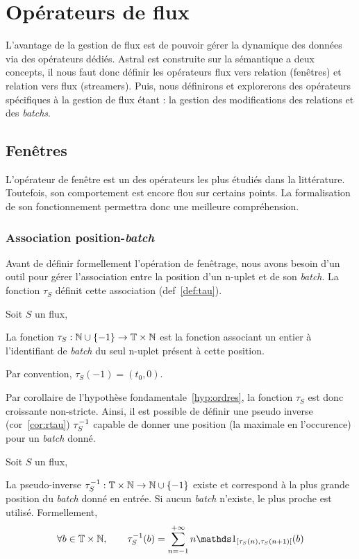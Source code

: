 \section{Opérateurs de flux}
L'avantage de la gestion de flux est de pouvoir gérer la dynamique des données via des opérateurs dédiés. Astral est construite sur la sémantique a deux concepts, il nous faut donc définir les opérateurs flux vers relation (fenêtres) et relation vers flux (streamers). Puis, nous définirons et explorerons des opérateurs spécifiques à la gestion de flux étant : la gestion des modifications des relations et des \textit{batchs}.
\subsection{Fenêtres}
L'opérateur de fenêtre est un des opérateurs les plus étudiés dans la littérature. Toutefois, son comportement est encore flou sur certains points. La formalisation de son fonctionnement permettra donc une meilleure compréhension.
\subsubsection{Association position-\textit{batch}}
Avant de définir formellement l'opération de fenêtrage, nous avons besoin d'un outil pour gérer l'association entre la position d'un n-uplet et de son \textit{batch}. La fonction $\tau_S$ définit cette association (def~\ref{def:tau}). 
\begin{defi}\label{def:tau}
    Soit $S$ un flux,

    La fonction $\tau_S : \mathbb{N}\cup\{-1\}\to \mathbb{T}\times\mathbb{N}$ est la fonction associant un entier à l'identifiant de \textit{batch} du seul n-uplet présent à cette position.

    Par convention, $\tau_S(-1)=(t_0,0)$.
\end{defi}

Par corollaire de l'hypothèse fondamentale~\ref{hyp:ordres}, la fonction $\tau_S$ est donc croissante non-stricte. Ainsi, il est possible de définir une pseudo inverse (cor~\ref{cor:rtau}) $\tau^{-1}_S$ capable de donner une position (la maximale en l'occurence) pour un \textit{batch} donné.
\begin{coro}\label{cor:rtau}
    Soit $S$ un flux,

    La pseudo-inverse $\tau^{-1}_S:\mathbb{T}\times\mathbb{N}\to \mathbb{N}\cup\{-1\}$ existe et correspond à la plus grande position du \textit{batch} donné en entrée. Si aucun \textit{batch} n'existe, le plus proche est utilisé. Formellement, $$\forall b \in \TN, \qquad \tau_S^{-1}(b) = \sum_{n=-1}^{+\infty} n \indic_{[\tau_S(n),\tau_S(n+1)[}(b)$$
\end{coro}

